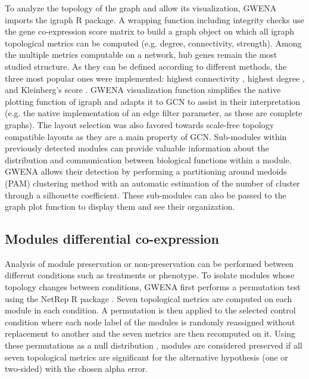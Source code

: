 To analyze the topology of the graph and allow its visualization, GWENA imports the igraph  R package. A wrapping function including integrity checks use the gene co-expression score matrix to build a graph object on which all igraph topological metrics can be computed (e.g. degree, connectivity, strength). 
Among the multiple metrics computable on a network, hub genes remain the most studied structure. As they can be defined according to different methods, the three most popular ones were implemented: highest connectivity , highest degree , and Kleinberg's score . 
GWENA visualization function simplifies the native plotting function of igraph and adapts it to GCN to assist in their interpretation (e.g. the native implementation of an edge filter parameter, as these are complete graphs). The layout selection was also favored towards scale-free topology compatible layouts as they are a main property of GCN.
Sub-modules within previously detected modules can provide valuable information about the distribution and communication between biological functions within a module. GWENA allows their detection by performing a partitioning around medoids (PAM) clustering method  with an automatic estimation of the number of cluster through a silhouette coefficient. These sub-modules can also be passed to the graph plot function to display them and see their organization.


\subsection{Modules differential co-expression}

Analysis of module preservation or non-preservation can be performed between different conditions such as treatments or phenotype. To isolate modules whose topology changes between conditions, GWENA first performs a permutation test using the NetRep R package . Seven topological metrics are computed on each module in each condition. A permutation is then applied to the selected control condition where each node label of the modules is randomly reassigned without replacement to another and the seven metrics are then recomputed on it. Using these permutations as a null distribution , modules are considered preserved if all seven topological metrics are significant for the alternative hypothesis (one or two-sided) with the chosen alpha error.

